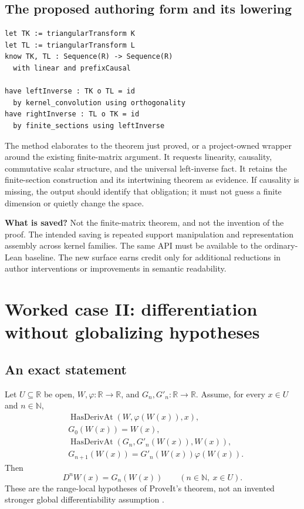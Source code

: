 \documentclass[11pt,letterpaper]{article}
\newcommand{\code}[1]{\texttt{\detokenize{#1}}}
\newcommand{\N}{\mathbb N}
\newcommand{\R}{\mathbb R}
\theoremstyle{definition}
\theoremstyle{remark}
\begin{document}
\subsection{The proposed authoring form and its lowering}
\begin{lstlisting}
let TK := triangularTransform K
let TL := triangularTransform L
know TK, TL : Sequence(R) -> Sequence(R)
  with linear and prefixCausal

have leftInverse : TK o TL = id
  by kernel_convolution using orthogonality
have rightInverse : TL o TK = id
  by finite_sections using leftInverse
\end{lstlisting}
The \code{finite_sections} method elaborates to the theorem just proved, or a
project-owned wrapper around the existing finite-matrix argument. It requests
linearity, causality, commutative scalar structure, and the universal
left-inverse fact. It retains the finite-section construction and its
intertwining theorem as evidence. If causality is missing, the output should
identify that obligation; it must not guess a finite dimension or quietly
change the space.

\textbf{What is saved?} Not the finite-matrix theorem, and not the invention of
the proof. The intended saving is repeated support manipulation and
representation assembly across kernel families. The same API must be available
to the ordinary-Lean baseline. The new surface earns credit only for additional
reductions in author interventions or improvements in semantic readability.

\section{Worked case II: differentiation without globalizing hypotheses}\label{sec:analysis}

\subsection{An exact statement}
Let $U\subseteq\R$ be open, $W,\varphi:\R\to\R$, and $G_n,G'_n:\R\to\R$.
Assume, for every $x\in U$ and $n\in\N$,
\begin{align*}
 &\operatorname{HasDerivAt}(W,\varphi(W(x)),x),\\
 &G_0(W(x))=W(x),\\
 &\operatorname{HasDerivAt}(G_n,G'_n(W(x)),W(x)),\\
 &G_{n+1}(W(x))=G'_n(W(x))\varphi(W(x)).
\end{align*}
Then
\begin{equation}\label{eq:iter}
                  D^nW(x)=G_n(W(x))\qquad(n\in\N,\ x\in U).
\end{equation}
These are the range-local hypotheses of ProveIt's theorem, not an invented
stronger global differentiability assumption \cite{autonomous}.
\end{document}
